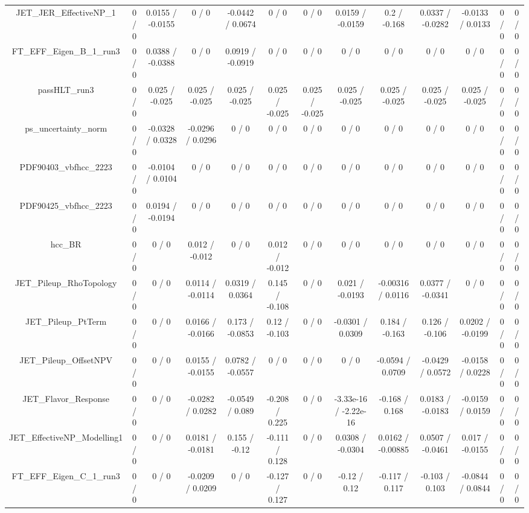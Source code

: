\documentclass[10pt]{article}
\begin{document}
\begin{table}[htbp]
\begin{center}
\begin{tabular}{|c|c|c|c|c|c|c|c|c|c|c|c|c|}
  JET_JER_EffectiveNP_1 & 0 / 0 & 0.0155 / -0.0155 & 0 / 0 & -0.0442 / 0.0674 & 0 / 0 & 0 / 0 & 0.0159 / -0.0159 & 0.2 / -0.168 & 0.0337 / -0.0282 & -0.0133 / 0.0133 & 0 / 0 & 0 / 0 \\ 
  FT_EFF_Eigen_B_1_run3 & 0 / 0 & 0.0388 / -0.0388 & 0 / 0 & 0.0919 / -0.0919 & 0 / 0 & 0 / 0 & 0 / 0 & 0 / 0 & 0 / 0 & 0 / 0 & 0 / 0 & 0 / 0 \\ 
  passHLT_run3 & 0 / 0 & 0.025 / -0.025 & 0.025 / -0.025 & 0.025 / -0.025 & 0.025 / -0.025 & 0.025 / -0.025 & 0.025 / -0.025 & 0.025 / -0.025 & 0.025 / -0.025 & 0.025 / -0.025 & 0 / 0 & 0 / 0 \\ 
  ps_uncertainty_norm & 0 / 0 & -0.0328 / 0.0328 & -0.0296 / 0.0296 & 0 / 0 & 0 / 0 & 0 / 0 & 0 / 0 & 0 / 0 & 0 / 0 & 0 / 0 & 0 / 0 & 0 / 0 \\ 
  PDF90403_vbfhcc_2223 & 0 / 0 & -0.0104 / 0.0104 & 0 / 0 & 0 / 0 & 0 / 0 & 0 / 0 & 0 / 0 & 0 / 0 & 0 / 0 & 0 / 0 & 0 / 0 & 0 / 0 \\ 
  PDF90425_vbfhcc_2223 & 0 / 0 & 0.0194 / -0.0194 & 0 / 0 & 0 / 0 & 0 / 0 & 0 / 0 & 0 / 0 & 0 / 0 & 0 / 0 & 0 / 0 & 0 / 0 & 0 / 0 \\ 
  hcc_BR & 0 / 0 & 0 / 0 & 0.012 / -0.012 & 0 / 0 & 0.012 / -0.012 & 0 / 0 & 0 / 0 & 0 / 0 & 0 / 0 & 0 / 0 & 0 / 0 & 0 / 0 \\ 
  JET_Pileup_RhoTopology & 0 / 0 & 0 / 0 & 0.0114 / -0.0114 & 0.0319 / 0.0364 & 0.145 / -0.108 & 0 / 0 & 0.021 / -0.0193 & -0.00316 / 0.0116 & 0.0377 / -0.0341 & 0 / 0 & 0 / 0 & 0 / 0 \\ 
  JET_Pileup_PtTerm & 0 / 0 & 0 / 0 & 0.0166 / -0.0166 & 0.173 / -0.0853 & 0.12 / -0.103 & 0 / 0 & -0.0301 / 0.0309 & 0.184 / -0.163 & 0.126 / -0.106 & 0.0202 / -0.0199 & 0 / 0 & 0 / 0 \\ 
  JET_Pileup_OffsetNPV & 0 / 0 & 0 / 0 & 0.0155 / -0.0155 & 0.0782 / -0.0557 & 0 / 0 & 0 / 0 & 0 / 0 & -0.0594 / 0.0709 & -0.0429 / 0.0572 & -0.0158 / 0.0228 & 0 / 0 & 0 / 0 \\ 
  JET_Flavor_Response & 0 / 0 & 0 / 0 & -0.0282 / 0.0282 & -0.0549 / 0.089 & -0.208 / 0.225 & 0 / 0 & -3.33e-16 / -2.22e-16 & -0.168 / 0.168 & 0.0183 / -0.0183 & -0.0159 / 0.0159 & 0 / 0 & 0 / 0 \\ 
  JET_EffectiveNP_Modelling1 & 0 / 0 & 0 / 0 & 0.0181 / -0.0181 & 0.155 / -0.12 & -0.111 / 0.128 & 0 / 0 & 0.0308 / -0.0304 & 0.0162 / -0.00885 & 0.0507 / -0.0461 & 0.017 / -0.0155 & 0 / 0 & 0 / 0 \\ 
  FT_EFF_Eigen_C_1_run3 & 0 / 0 & 0 / 0 & -0.0209 / 0.0209 & 0 / 0 & -0.127 / 0.127 & 0 / 0 & -0.12 / 0.12 & -0.117 / 0.117 & -0.103 / 0.103 & -0.0844 / 0.0844 & 0 / 0 & 0 / 0 \\ 

\end{tabular}
\end{center}
\end{table}
\end{document}

